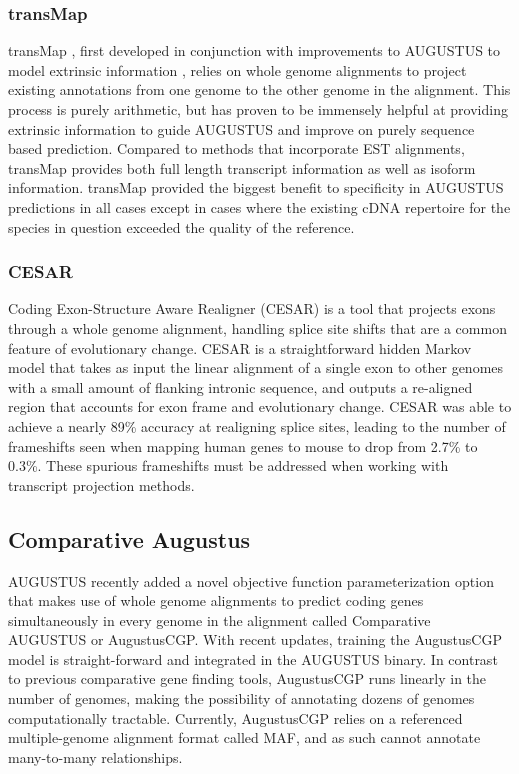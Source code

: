 \documentclass[fleqn,10pt]{wlscirep}
\begin{document}
\subsubsection{transMap}
transMap \cite{stanke2008using}, first developed in conjunction with improvements to AUGUSTUS to model extrinsic information \cite{stanke2004augustus}, relies on whole genome alignments to project existing annotations from one genome to the other genome in the alignment. This process is purely arithmetic, but has proven to be immensely helpful at providing extrinsic information to guide AUGUSTUS and improve on purely sequence based prediction. Compared to methods that incorporate EST alignments, transMap provides both full length transcript information as well as isoform information.
transMap provided the biggest benefit to specificity in AUGUSTUS predictions in all cases except in cases where the existing cDNA repertoire for the species in question exceeded the quality of the reference.

\subsubsection{CESAR}
Coding Exon-Structure Aware Realigner (CESAR) \cite{sharma2016coding} is a tool that projects exons through a whole genome alignment, handling splice site shifts that are a common feature of evolutionary change. CESAR is a straightforward hidden Markov model that takes as input the linear alignment of a single exon to other genomes with a small amount of flanking intronic sequence, and outputs a re-aligned region that accounts for exon frame and evolutionary change. CESAR was able to achieve a nearly 89\% accuracy at realigning splice sites, leading to the number of frameshifts seen when mapping human genes to mouse to drop from 2.7\% to 0.3\%. These spurious frameshifts must be addressed when working with transcript projection methods.

\subsection{Comparative Augustus}
AUGUSTUS recently added a novel objective function parameterization option that makes use of whole genome alignments to predict coding genes simultaneously in every genome in the alignment \cite{konig2015simultaneous} called Comparative AUGUSTUS or AugustusCGP. With recent updates, training the AugustusCGP model is straight-forward and integrated in the AUGUSTUS binary. In contrast to previous comparative gene finding tools, AugustusCGP runs linearly in the number of genomes, making the possibility of annotating dozens of genomes computationally tractable. Currently, AugustusCGP relies on a referenced multiple-genome alignment format called MAF, and as such cannot annotate many-to-many relationships.
\end{document}
